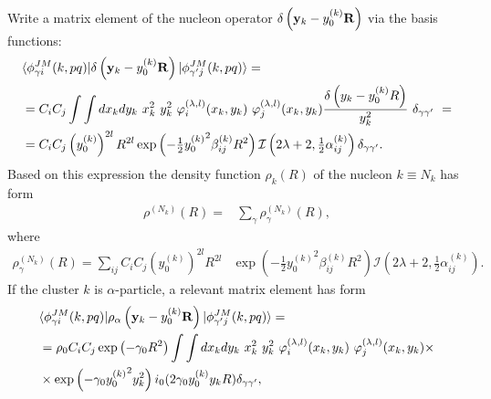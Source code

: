 \documentclass[
12pt, %
oneside, %
english, %
doublespacing, %
doublespacing, %
toctotoc, %
parskip, %
headsepline, %
]{MastersDoctoralThesis} %
\begin{document}


Write a matrix element of the nucleon operator $\delta \left( {\bf y}_k-y^{(k)}_0 {\bf R} \right)$ via the basis functions:
\begin{align}
&\langle \phi^{JM}_{\gamma i} (k,pq) \vert 
\delta \left( {\bf y}_k-y^{(k)}_0 {\bf R} \right)
\vert \phi^{JM}_{\gamma' j} (k,pq) \rangle = 
 \label{me_delta_k}\\
& =C_i C_j  \int \int d{ x}_k d{ y}_k ~x_k^{2} ~y^{2}_k
~\varphi^{(\lambda,l)}_i(x_k,y_k) 
~\varphi^{(\lambda,l)}_j (x_k,y_k)
\frac{\delta \left( { y}_k-y^{(k)}_0 { R} \right)}{y_k^2} ~
 \delta_{\gamma \gamma'}~ =
 \nonumber \\
&=
C_iC_j  
\left( y_0^{(k)} \right)^{2l}
R^{2l} 
\exp \left( -\tfrac{1}{2} {y_0^{(k)}}^2 \beta^{(k)}_{ij} R^2 \right)
\mathcal{I}\left( 2\lambda+2, \tfrac{1}{2} \alpha_{ij}^{(k)} \right)  \delta_{\gamma \gamma'}.~
\nonumber
 \end{align}
Based on this expression the density function $\rho_k(R)$ of the nucleon $k \equiv N_k$ has form
\begin{align}
\rho^{(N_k)}(R)=&\sum_{\gamma} \rho^{(N_k)}_\gamma(R),
\label{rho_nk}
\end{align}
where
\begin{align}
\rho^{(N_k)}_\gamma(R)=\sum_{ij} 
C_iC_j  
\left( y_0^{(k)} \right)^{2l}
R^{2l} 
&\exp \left( -\tfrac{1}{2} {y_0^{(k)}}^2 \beta^{(k)}_{ij} R^2 \right)
\mathcal{I}\left( 2\lambda+2, \tfrac{1}{2} \alpha_{ij}^{(k)} \right).
\nonumber
\end{align}
If the cluster $k$ is $\alpha$-particle, a relevant matrix element has form
\begin{align}
&\langle \phi^{JM}_{\gamma i} (k,pq) \vert 
\rho_\alpha \left( {\bf y}_k-y^{(k)}_0 {\bf R} \right)
\vert \phi^{JM}_{\gamma' j} (k,pq) \rangle = 
\label{me_rho_alpha}
\\
\nonumber
& = \rho_0 C_i C_j \exp\left(-\gamma_0 R^2 \right)
 \int \int d{ x}_k d{ y}_k ~x_k^{2} ~y^{2}_k
~\varphi^{(\lambda,l)}_i(x_k,y_k) 
~\varphi^{(\lambda,l)}_j (x_k,y_k) \times \\
& \times \exp \left(-\gamma_0 {y_0^{(k)}}^2 y^2_k \right)
i_0(2\gamma_0 y_0^{(k)} y_k R) \delta_{\gamma \gamma'},
\nonumber
\end{align} 
\end{document}
